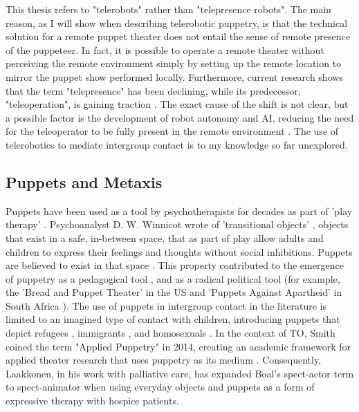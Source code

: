 \documentclass[dissertation,math,vertlayout,pdfa,colorlinks]{aaltoseries}
\begin{document}
This thesis refers to "telerobots" rather than "telepresence robots". The main reason, as I will show when describing telerobotic puppetry, is that the technical solution for a remote puppet theater does not entail the sense of remote presence of the puppeteer. In fact, it is possible to operate a remote theater without perceiving the remote environment simply by setting up the remote location to mirror the puppet show performed locally. Furthermore, current research shows that the term "telepresence" has been declining, while its predecessor, "teleoperation", is gaining traction \cite{rosa-garciaBridgingRemoteOperations2025}. The exact cause of the shift is not clear, but a possible factor is the development of robot autonomy and AI, reducing the need for the teleoperator to be fully present in the remote environment \cite{darvishTeleoperationHumanoidRobots2023}. The use of telerobotics to mediate intergroup contact is to my knowledge so far unexplored.

\subsection{Puppets and Metaxis}
Puppets have been used as a tool by psychotherapists for decades as part of 'play therapy' \cite{aronoffPuppetryTherapeuticMedium1996}. Psychoanalyst D. W. Winnicot wrote of 'transitional objects' \cite{winnicottPlayingReality1991}, objects that exist in a safe, in-between space, that as part of play allow adults and children to express their feelings and thoughts without social inhibitions. Puppets are believed to exist in that space \cite{triminghamObjectsTransitionPuppet2010, wisniewskaHybridityPuppetry2020}. This property contributed to the emergence of puppetry as a pedagogical tool \cite{krogerPuppetPedagogicalTool2019}, and as a radical political tool (for example, the 'Bread and Puppet Theater' in the US \cite{schumannRadicalityPuppetTheatre1991} and 'Puppets Against Apartheid' in South Africa \cite{krugerPuppetsPoliticsFinding2016}). The use of puppets in intergroup contact in the literature is limited to an imagined type of contact with children, introducing puppets that depict refugees \cite{charalampidouInventingNewRoad2022}, immigrants \cite{jonesNoStringsAttached2020}, and homosexuals \cite{mausKindergartenChildrensAttitudes2025}. In the context of TO, Smith coined the term "Applied Puppetry" in 2014, creating an academic framework for applied theater research that uses puppetry as its medium \cite{purcell-gatesAppliedPuppetryCommunities2020}. Consequently, Laakkonen, in his work with palliative care, has expanded Boal's spect-actor term to spect-animator when using everyday objects and puppets as a form of expressive therapy with hospice patients. 
\end{document}
